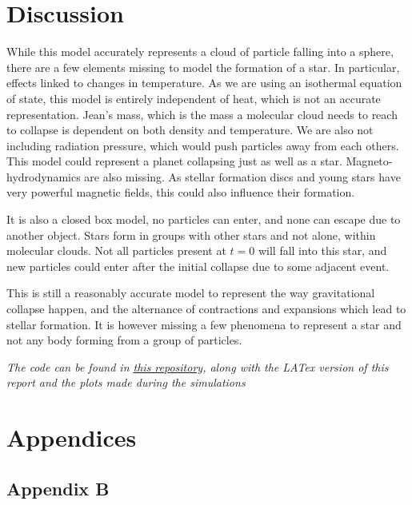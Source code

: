 \documentclass[a4paper,12pt]{article}
\begin{document}
\section{Discussion}
\label{sec:disc}
While this model accurately represents a cloud of particle falling into a sphere, there are a few elements missing to model the formation of a star. In particular, effects linked to changes in temperature. As we are using an isothermal equation of state, this model is entirely independent of heat, which is not an accurate representation. Jean's mass, which is the mass a molecular cloud needs to reach to collapse is dependent on both density and temperature. We are also not including radiation pressure, which would push particles away from each others. This model could represent a planet collapsing just as well as a star. Magneto-hydrodynamics are also missing. As stellar formation discs and young stars have very powerful magnetic fields, this could also influence their formation. 

It is also a closed box model, no particles can enter, and none can escape due to another object. Stars form in groups with other stars and not alone, within molecular clouds. Not all particles present at $t=0$ will fall into this star, and new particles could enter after the initial collapse due to some adjacent event.\newline


This is still a reasonably accurate model to represent the way gravitational collapse happen, and the alternance of contractions and expansions which lead to stellar formation. It is however missing a few phenomena to represent a star and not any body forming from a group of particles.\newline



\emph{The code can be found in \hyperlink{https://github.com/AlbanSMA/CompAstro2_Projec1}{this repository}, along with the LATex version of this report and the plots made during the simulations}

\pagebreak
\section{Appendices}
\subsection{Appendix B}
\label{sec:AppB}
\end{document}
